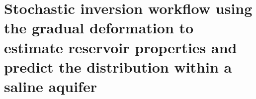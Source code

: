 
\pagestyle{fancy}
\fancyhf{}
\renewcommand{\headrulewidth}{0pt}
\fancyhead[RO]{\thepage}
\fancyhead[LE]{\thepage}


\chapter{Stochastic inversion workflow using the gradual deformation to estimate
reservoir properties and predict the \texorpdfstring{}{CO2} distribution
within a saline aquifer}
\label{ch:article2}


